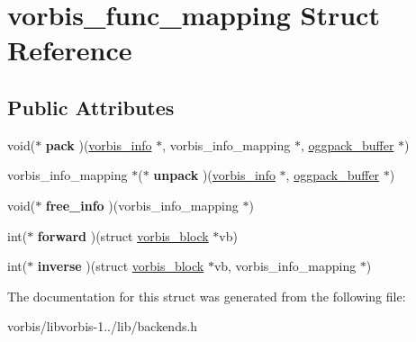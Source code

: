 \hypertarget{structvorbis__func__mapping}{\section{vorbis\+\_\+func\+\_\+mapping Struct Reference}
\label{structvorbis__func__mapping}
}
\subsection*{Public Attributes}
\begin{DoxyCompactItemize}
\item 
\hypertarget{structvorbis__func__mapping_a384e4d75dd8222cb7d097e6415f130c3}{void($\ast$ {\bfseries pack} )(\hyperlink{structvorbis__info}{vorbis\+\_\+info} $\ast$, vorbis\+\_\+info\+\_\+mapping $\ast$, \hyperlink{structoggpack__buffer}{oggpack\+\_\+buffer} $\ast$)}\label{structvorbis__func__mapping_a384e4d75dd8222cb7d097e6415f130c3}

\item 
\hypertarget{structvorbis__func__mapping_a94738850027c9ca560f94d39e0420b09}{vorbis\+\_\+info\+\_\+mapping $\ast$($\ast$ {\bfseries unpack} )(\hyperlink{structvorbis__info}{vorbis\+\_\+info} $\ast$, \hyperlink{structoggpack__buffer}{oggpack\+\_\+buffer} $\ast$)}\label{structvorbis__func__mapping_a94738850027c9ca560f94d39e0420b09}

\item 
\hypertarget{structvorbis__func__mapping_a6abee339af02bbc56fc38b4832dfbe77}{void($\ast$ {\bfseries free\+\_\+info} )(vorbis\+\_\+info\+\_\+mapping $\ast$)}\label{structvorbis__func__mapping_a6abee339af02bbc56fc38b4832dfbe77}

\item 
\hypertarget{structvorbis__func__mapping_aa7d7b5ce40e10c43e1336e44671c195f}{int($\ast$ {\bfseries forward} )(struct \hyperlink{structvorbis__block}{vorbis\+\_\+block} $\ast$vb)}\label{structvorbis__func__mapping_aa7d7b5ce40e10c43e1336e44671c195f}

\item 
\hypertarget{structvorbis__func__mapping_aee7929ef345e78b76e42e76bc4490bcf}{int($\ast$ {\bfseries inverse} )(struct \hyperlink{structvorbis__block}{vorbis\+\_\+block} $\ast$vb, vorbis\+\_\+info\+\_\+mapping $\ast$)}\label{structvorbis__func__mapping_aee7929ef345e78b76e42e76bc4490bcf}

\end{DoxyCompactItemize}


The documentation for this struct was generated from the following file\+:\begin{DoxyCompactItemize}
\item 
vorbis/libvorbis-\/1../lib/backends.\+h\end{DoxyCompactItemize}
